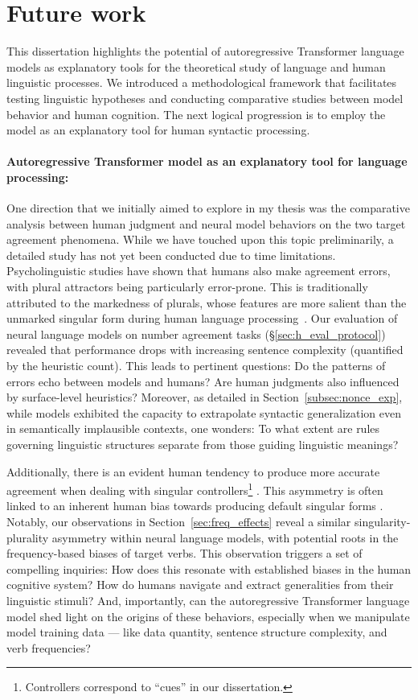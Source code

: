 \section{Future work}
This dissertation highlights the potential of autoregressive Transformer language models as explanatory tools for the theoretical study of language and human linguistic processes. We introduced a methodological framework that facilitates testing linguistic hypotheses and conducting comparative studies between model behavior and human cognition. The next logical progression is to employ the model as an explanatory tool for human syntactic processing.

\paragraph{Autoregressive Transformer model as an explanatory tool for language processing:}
One direction that we initially aimed to explore in my thesis was the comparative analysis between human judgment and neural model behaviors on the two target agreement phenomena. While we have touched upon this topic preliminarily, a detailed study has not yet been conducted due to time limitations. Psycholinguistic studies have shown that humans also make agreement errors, with plural attractors being particularly error-prone. This is traditionally attributed to the markedness of plurals, whose features are more salient than the unmarked singular form during human language processing~\citep{BOCK199145,eberhard2005making}.
Our evaluation of neural language models on number agreement tasks (\S\ref{sec:h_eval_protocol}) revealed that performance drops with increasing sentence complexity (quantified by the heuristic count). This leads to pertinent questions: Do the patterns of errors echo between models and humans? Are human judgments also influenced by surface-level heuristics? Moreover, as detailed in Section~\ref{subsec:nonce_exp}, while models exhibited the capacity to extrapolate syntactic generalization even in semantically implausible contexts, one wonders: To what extent are rules governing linguistic structures separate from those guiding linguistic meanings?

Additionally, there is an evident human tendency to produce more accurate agreement when dealing with singular controllers\footnote{Controllers correspond to ``cues'' in our dissertation.} \citep{villata2017intervention}. This asymmetry is often linked to an inherent human bias towards producing default singular forms \citep{greenberg1963some,corbett2000gender}. Notably, our observations in Section~\ref{sec:freq_effects} reveal a similar singularity-plurality asymmetry within neural language models, with potential roots in the frequency-based biases of target verbs. This observation triggers a set of compelling inquiries: How does this resonate with established biases in the human cognitive system?
How do humans navigate and extract generalities from their linguistic stimuli? And, importantly, can the autoregressive Transformer language model shed light on the origins of these behaviors, especially when we manipulate model training data --- like data quantity, sentence structure complexity, and verb frequencies?

